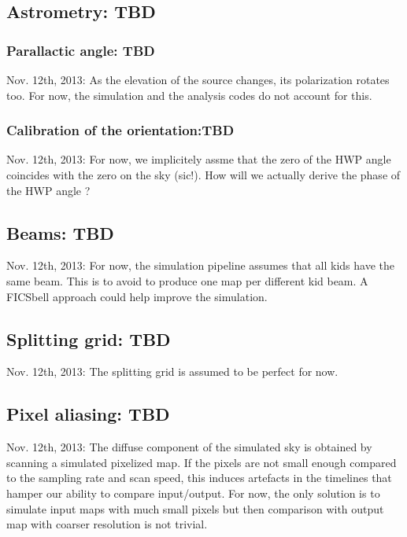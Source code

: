 \documentclass[a4paper]{article}
\begin{document}
\subsection{Astrometry: TBD}

\subsubsection{Parallactic angle: TBD}
Nov. 12th, 2013: As the elevation of the source changes, its polarization rotates too. For now,
the simulation and the analysis codes do not account for this.

\subsubsection{Calibration of the orientation:TBD}
Nov. 12th, 2013: For now, we implicitely assme that the zero of the HWP angle coincides with the
zero on the sky (sic!). How will we actually derive the phase of the HWP angle ?

\subsection{Beams: TBD}
Nov. 12th, 2013: For now, the simulation pipeline assumes that all kids have the same beam. This
is to avoid to produce one map per different kid beam. A FICSbell approach could
help improve the simulation.

\subsection{Splitting grid: TBD}
Nov. 12th, 2013: The splitting grid is assumed to be perfect for now.

\subsection{Pixel aliasing: TBD}
Nov. 12th, 2013: The diffuse component of the simulated sky is obtained by
scanning a simulated pixelized map. If the pixels are not small enough compared
to the sampling rate and scan speed, this induces artefacts in the timelines
that hamper our ability to compare input/output. For now, the only solution is
to simulate input maps with much small pixels but then comparison with output
map with coarser resolution is not trivial.
\end{document}
